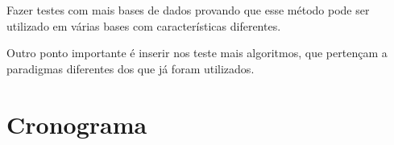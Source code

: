 Fazer testes com mais bases de dados  provando que esse método pode ser utilizado em várias bases com características  diferentes.

Outro ponto importante é inserir nos teste mais algoritmos, que pertençam a  paradigmas diferentes dos que já foram utilizados.




\section{Cronograma}\label{cap:cron}

